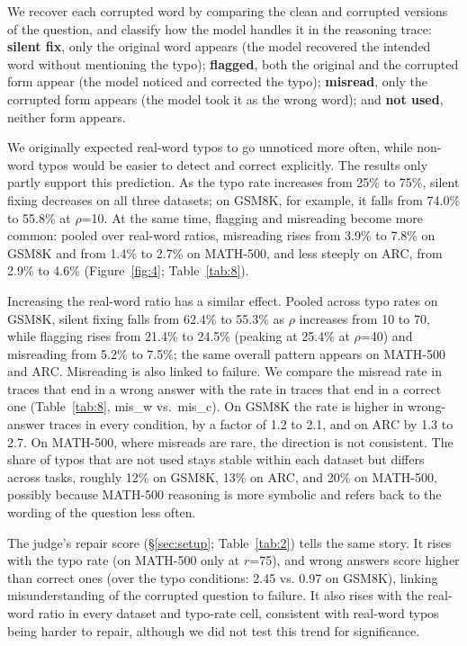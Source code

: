 \documentclass[11pt]{article}
\begin{document}
We recover each corrupted word by comparing the clean and corrupted versions of the question, and classify how the model handles it in the reasoning trace: \textbf{silent fix}, only the original word appears (the model recovered the intended word without mentioning the typo); \textbf{flagged}, both the original and the corrupted form appear (the model noticed and corrected the typo); \textbf{misread}, only the corrupted form appears (the model took it as the wrong word); and \textbf{not used}, neither form appears.

We originally expected real-word typos to go unnoticed more often, while non-word typos would be easier to detect and correct explicitly. The results only partly support this prediction. As the typo rate increases from 25\% to 75\%, silent fixing decreases on all three datasets; on GSM8K, for example, it falls from 74.0\% to 55.8\% at $\rho$=10. At the same time, flagging and misreading become more common: pooled over real-word ratios, misreading rises from 3.9\% to 7.8\% on GSM8K and from 1.4\% to 2.7\% on MATH-500, and less steeply on ARC, from 2.9\% to 4.6\% (Figure~\ref{fig:4}; Table~\ref{tab:8}).

Increasing the real-word ratio has a similar effect. Pooled across typo rates on GSM8K, silent fixing falls from 62.4\% to 55.3\% as $\rho$ increases from 10 to 70, while flagging rises from 21.4\% to 24.5\% (peaking at 25.4\% at $\rho$=40) and misreading from 5.2\% to 7.5\%; the same overall pattern appears on MATH-500 and ARC. Misreading is also linked to failure. We compare the misread rate in traces that end in a wrong answer with the rate in traces that end in a correct one (Table~\ref{tab:8}, mis\_w vs.\ mis\_c). On GSM8K the rate is higher in wrong-answer traces in every condition, by a factor of 1.2 to 2.1, and on ARC by 1.3 to 2.7. On MATH-500, where misreads are rare, the direction is not consistent. The share of typos that are not used stays stable within each dataset but differs across tasks, roughly 12\% on GSM8K, 13\% on ARC, and 20\% on MATH-500, possibly because MATH-500 reasoning is more symbolic and refers back to the wording of the question less often.

The judge's repair score (\S\ref{sec:setup}; Table~\ref{tab:2}) tells the same story. It rises with the typo rate (on MATH-500 only at $r$=75), and wrong answers score higher than correct ones (over the typo conditions: 2.45 vs. 0.97 on GSM8K), linking misunderstanding of the corrupted question to failure. It also rises with the real-word ratio in every dataset and typo-rate cell, consistent with real-word typos being harder to repair, although we did not test this trend for significance.
\end{document}
